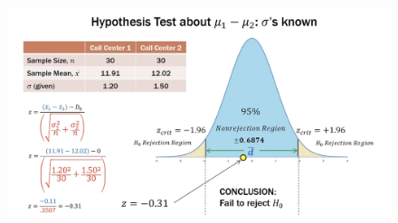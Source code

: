 \documentclass{article}
\begin{document}
\begin{figure}[H]
    \centering
    \includegraphics[width=1\linewidth]{2sampzexample.png}
\end{figure}
\end{document}
